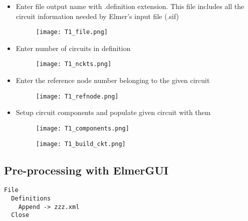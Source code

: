 \begin{itemize}
  \item Enter file output name with .definition extension. This file includes all the circuit information needed by Elmer's input file (.sif)
  \begin{figure}[H]
\centering
\texttt{[image: T1\_file.png]}
\end{figure}  
    \item Enter number of circuits in definition
      \begin{figure}[H]
\centering
\texttt{[image: T1\_nckts.png]}
\end{figure}  
    \item Enter the reference node number belonging to the given circuit  
      \begin{figure}[H]
\centering
\texttt{[image: T1\_refnode.png]}
\end{figure}  
    \item Setup circuit components and populate given circuit with them
      \begin{figure}[H]
\centering
\texttt{[image: T1\_components.png]}
\end{figure}  

      \begin{figure}[H]
\centering
\texttt{[image: T1\_build\_ckt.png]}
\end{figure}  

\end{itemize}



\subsection*{Pre-processing with ElmerGUI}



\begin{verbatim}
File
  Definitions
    Append -> zzz.xml
  Close
\end{verbatim}

